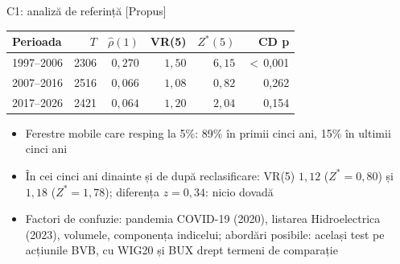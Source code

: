 \ifsolutions
\begin{frame}{C1: analiză de referință [Propus]}
\itemsize{\footnotesize}
\begin{center}
\footnotesize
\begin{tabular}{lrrrrr}
\toprule
Perioada & $T$ & $\hat\rho(1)$ & VR(5) & $Z^*(5)$ & CD p \\
\midrule
1997--2006 & 2306 & $0{,}270$ & $1{,}50$ & $6{,}15$ & $<$\,0{,}001 \\
2007--2016 & 2516 & $0{,}066$ & $1{,}08$ & $0{,}82$ & 0{,}262 \\
2017--2026 & 2421 & $0{,}064$ & $1{,}20$ & $2{,}04$ & 0{,}154 \\
\bottomrule
\end{tabular}
\end{center}
\begin{itemize}
    \item Ferestre mobile care resping la 5\%: 89\% în primii cinci ani, 15\% în ultimii cinci ani
    \item În cei cinci ani dinainte și de după reclasificare: VR(5) $1{,}12$ ($Z^* = 0{,}80$) și $1{,}18$ ($Z^* = 1{,}78$); diferența $z = 0{,}34$: nicio dovadă
    \item Factori de confuzie: pandemia COVID-19 (2020), listarea Hidroelectrica (2023), volumele, componența indicelui; abordări posibile: același test pe acțiunile BVB, cu WIG20 și BUX drept termeni de comparație
\end{itemize}
\end{frame}
\fi


